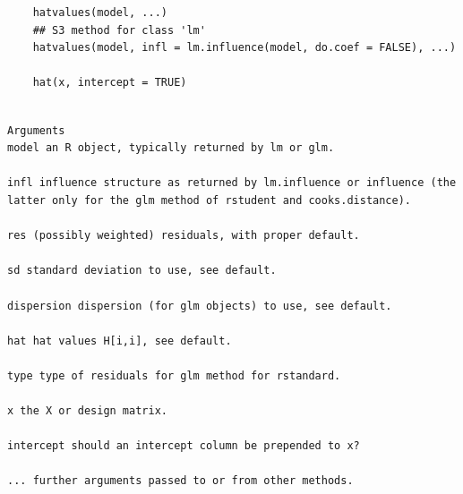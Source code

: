 \documentclass[residuals.tex]{subfiles}
\begin{document}
\begin{framed}
	\begin{verbatim}
	hatvalues(model, ...)
	## S3 method for class 'lm'
	hatvalues(model, infl = lm.influence(model, do.coef = FALSE), ...)
	
	hat(x, intercept = TRUE)
	
	\end{verbatim}
\end{framed}
\begin{verbatim}
Arguments
model an R object, typically returned by lm or glm.

infl influence structure as returned by lm.influence or influence (the latter only for the glm method of rstudent and cooks.distance).

res (possibly weighted) residuals, with proper default.

sd standard deviation to use, see default.

dispersion dispersion (for glm objects) to use, see default.

hat hat values H[i,i], see default.

type type of residuals for glm method for rstandard.

x the X or design matrix.

intercept should an intercept column be prepended to x?

... further arguments passed to or from other methods.

\end{verbatim}

\newpage
\end{document}

